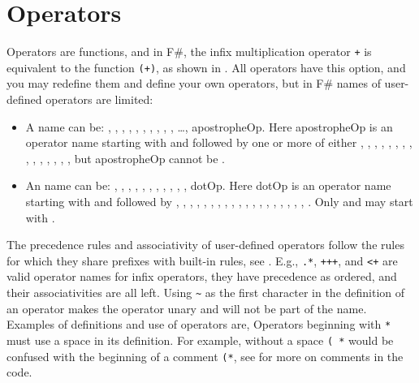 \section{Operators}
\label{sec:operators}
Operators are functions, and in F\#, the infix multiplication operator \lstinline!+! is equivalent to the function \lstinline!(+)!, as shown in .
%
%
All operators have this option, and you may redefine them and define your own operators, but in F\# names of user-defined operators are limited:
\begin{itemize}
\item A  name can be: \lexeme{+}, \lexeme{-}, , , \lexeme{\%}, \lexeme{\&}, \lexeme{\&\&}, \lexeme{\~\~}, \lexeme{\~\~\~}, \lexeme{\~\~\~\~}, \dots, apostropheOp. Here apostropheOp is an operator name starting with \lexeme{!} and followed by one or more of either \lexeme{!}, \lexeme{\%}, \lexeme{\&}, \lexeme{*}, \lexeme{+}, \lexeme{-}, , \lexeme{/}, \lexeme{<}, \lexeme{=}, \lexeme{>}, , \lexeme{^}, \lexeme{|}, \lexeme{\~}, but apostropheOp cannot be \lexeme{!=}.
\item An  name can be: \lexeme{+}, \lexeme{-}, , , \lexeme{\%}, \lexeme{\&}, \lexeme{\&\&}, \lexeme{:=}, \lexeme{::}, \lexeme{\$}, , dotOp. Here dotOp is an operator name starting with  and followed by \lexeme{+}, \lexeme{-}, , , \lexeme{\%}, \lexeme{\&}, \lexeme{\&\&}, \lexeme{-}, \lexeme{+}, \lexeme{\|\|}, \lexeme{<}, \lexeme{>}, \lexeme{=}, \lexeme{\|}, \lexeme{\&}, \lexeme{\^}, \lexeme{*}, \lexeme{/}, \lexeme{\%}, \lexeme{!=}. Only  and  may start with .
  \end{itemize}
The precedence rules and associativity of user-defined operators follow the rules for which they share prefixes with built-in rules, see . E.g., \lstinline!.*!, \lstinline!+++!, and \lstinline!<+! are valid operator names for infix operators, they have precedence as ordered, and their associativities are all left. Using \lstinline!~! as the first character in the definition of an operator makes the operator unary and will not be part of the name. Examples of definitions and use of operators are,
%
%
Operators beginning with \lstinline!*! must use a space in its definition. For example, without a space \lstinline!( *! would be confused with the beginning of a comment \lstinline!(*!, see  for more on comments in the code.

